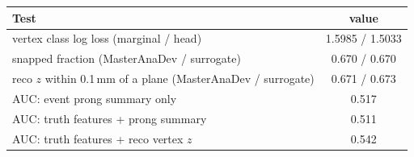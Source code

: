 \begin{tabular}{lc}
\toprule
Test & value \\
\midrule
vertex class log loss (marginal / head) & 1.5985 / 1.5033 \\
snapped fraction (MasterAnaDev / surrogate) & 0.670 / 0.670 \\
reco $z$ within 0.1\,mm of a plane (MasterAnaDev / surrogate) & 0.671 / 0.673 \\
\midrule
AUC: event prong summary only & 0.517 \\
AUC: truth features + prong summary & 0.511 \\
AUC: truth features + reco vertex $z$ & 0.542 \\
\bottomrule
\end{tabular}
